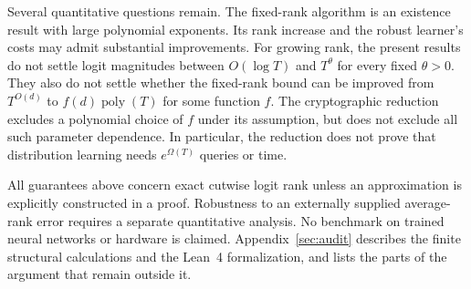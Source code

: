 \documentclass[11pt]{article}
\newcommand{\poly}{\operatorname{poly}}
\theoremstyle{definition}
\theoremstyle{remark}
\begin{document}
Several quantitative questions remain. The fixed-rank algorithm is an existence result with large polynomial exponents. Its rank increase and the robust learner's costs may admit substantial improvements. For growing rank, the present results do not settle logit magnitudes between $O(\log T)$ and $T^\theta$ for every fixed $\theta>0$. They also do not settle whether the fixed-rank bound can be improved from $T^{O(d)}$ to $f(d)\poly(T)$ for some function $f$. The cryptographic reduction excludes a polynomial choice of $f$ under its assumption, but does not exclude all such parameter dependence.
In particular, the reduction does not prove that distribution learning needs $e^{\Omega(T)}$ queries or time.

All guarantees above concern exact cutwise logit rank unless an approximation is explicitly constructed in a proof. Robustness to an externally supplied average-rank error requires a separate quantitative analysis. No benchmark on trained neural networks or hardware is claimed. Appendix~\ref{sec:audit} describes the finite structural calculations and the Lean~4 formalization, and lists the parts of the argument that remain outside it.
\end{document}

